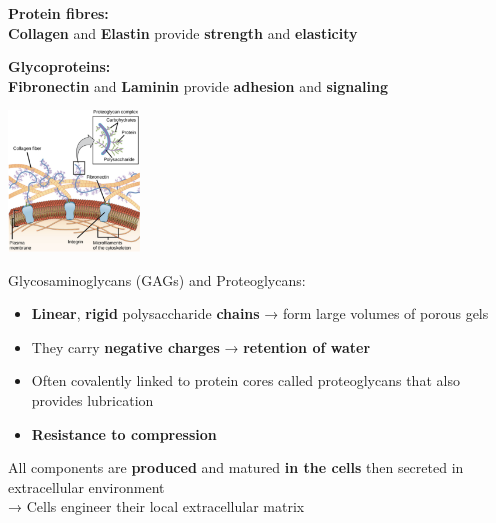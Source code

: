 \begin{minipage}{0.45\linewidth}
    \textbf{Protein fibres:}\\
    \textbf{Collagen} and \textbf{Elastin}      provide \textbf{strength} and \textbf{elasticity}

    \vspace{10mm}
    \textbf{Glycoproteins:}\\
    \textbf{Fibronectin} and \textbf{Laminin}      provide \textbf{adhesion} and \textbf{signaling}

\end{minipage}
\begin{minipage}{0.45\linewidth}
    \includegraphics[width=35mm]{src/Images/ecm_composition.png}
\end{minipage}

Glycosaminoglycans (GAGs) and Proteoglycans:\\

\begin{itemize}
    \item \textbf{Linear}, \textbf{rigid} polysaccharide \textbf{chains} → form large volumes of porous gels
    \item They carry \textbf{negative charges} → \textbf{retention of water}
    \item Often covalently linked to protein cores called proteoglycans that also provides lubrication
    \item \textbf{Resistance to compression}
\end{itemize}

All components are \textbf{produced} and matured \textbf{in the cells} then secreted in extracellular environment\\
→ Cells engineer their local extracellular matrix
